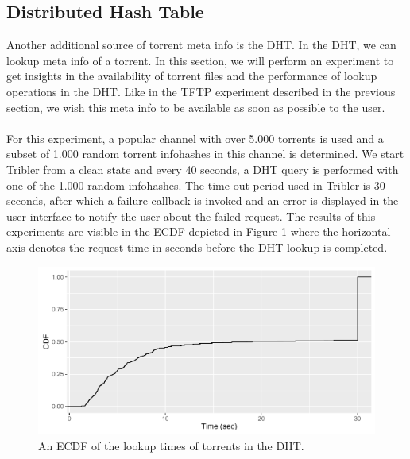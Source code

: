 \subsection{Distributed Hash Table}
\label{subsec:dht-experiment}
Another additional source of torrent meta info is the DHT. In the DHT, we can lookup meta info of a torrent. In this section, we will perform an experiment to get insights in the availability of torrent files and the performance of lookup operations in the DHT. Like in the TFTP experiment described in the previous section, we wish this meta info to be available as soon as possible to the user.\\\\
For this experiment, a popular channel with over 5.000 torrents is used and a subset of 1.000 random torrent infohashes in this channel is determined. We start Tribler from a clean state and every 40 seconds, a DHT query is performed with one of the 1.000 random infohashes. The time out period used in Tribler is 30 seconds, after which a failure callback is invoked and an error is displayed in the user interface to notify the user about the failed request. The results of this experiments are visible in the ECDF depicted in Figure \ref{fig:metainfo_fetch} where the horizontal axis denotes the request time in seconds before the DHT lookup is completed.\\

\begin{figure}[!h]
	\centering
	\includegraphics[width=1.0\columnwidth]{images/experiments/metainfo_fetch}
	\caption{An ECDF of the lookup times of torrents in the DHT.}
	\label{fig:metainfo_fetch}
\end{figure}


